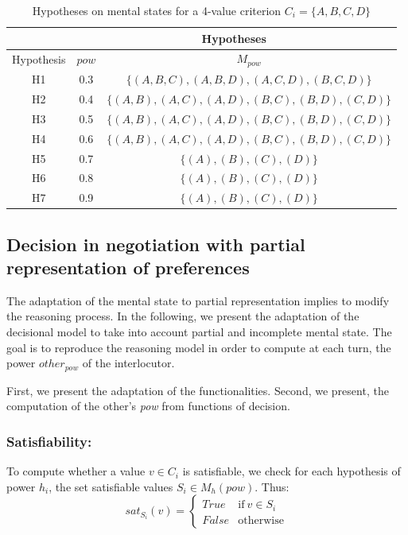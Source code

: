 \documentclass[conference, letterpaper]{IEEEtran}
\begin{document}
	\begin{table}[h]
		\centering
		\caption{Hypotheses on mental states for a 4-value criterion $C_i=\{A, B, C, D\}$}
		\begin{tabular}{ |c|c|c| }
			\hline
			& \multicolumn{2}{c|}{Hypotheses}  \\
			\hline
			Hypothesis & $pow$ & $M_{pow}$ \\
			\hline
			H1&0.3&$\{ (A,B,C) , (A,B,D), (A,C,D), (B,C,D) \}$ \\
			\hline
			H2&0.4&$\{ (A,B), (A,C), (A,D), (B,C), (B,D), (C,D) \}$ \\
			\hline
			H3&0.5&$\{ (A,B), (A,C), (A,D), (B,C), (B,D), (C,D) \}$\\
			\hline
			H4&0.6&$\{ (A,B), (A,C), (A,D), (B,C), (B,D), (C,D) \}$ \\
			\hline
			H5&0.7&$\{ (A), (B), (C), (D) \}$\\
			\hline
			H6&0.8&$\{ (A), (B), (C), (D) \}$ \\
			\hline
			H7&0.9&$\{ (A), (B), (C), (D) \}$ \\
			\hline
		\end{tabular}
		
		\label{table:poss}
	\end{table}
	
	\subsection{Decision in negotiation with partial representation of preferences}
	The adaptation of the mental state to partial representation implies to modify the reasoning process. In the following, we present the adaptation of the decisional model to take into account partial and incomplete mental state. The goal is to reproduce the reasoning model in order to compute at each turn, the power $other_{pow}$ of the interlocutor. 
	
	First, we present the adaptation of the functionalities. Second, we present, the computation of the other's \emph{pow} from functions of decision.   
	
	\subsubsection{Satisfiability:}
	To compute whether a value $v \in C_i$ is satisfiable, we check for each hypothesis of power $h_i$, the set satisfiable values $S_i \in M_h(pow)$.
	Thus: 
	\begin{equation}
	sat_{S_i}(v)= \left\{\begin{array}{ll}
	True	 & \mathrm{if\ }  v \in S_i\\
	False & \mathrm{otherwise}
	\end{array}\right.
	\end{equation}
	
\end{document}
